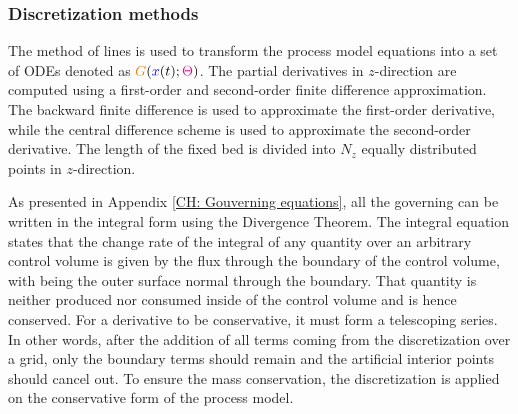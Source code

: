 \documentclass[../Article_Model_Parameters.tex]{subfiles}
\begin{document}
			\subsubsection{Discretization methods}
			
			The method of lines is used to transform the process model equations into a set of ODEs denoted as ${\color{orange}G}({\color{blue}x}(t);{\color{magenta}\Theta})$. The partial derivatives in $z$-direction are computed using a first-order and second-order finite difference approximation. The backward finite difference is used to approximate the first-order derivative, while the central difference scheme is used to approximate the second-order derivative. The length of the fixed bed is divided into $N_z$ equally distributed points in $z$-direction. 
			
			As presented in Appendix \ref{CH: Gouverning equations}, all the governing can be written in the integral form using the Divergence Theorem. The integral equation states that the change rate of the integral of any quantity over an arbitrary control volume is given by the flux through the boundary of the control volume, with being the outer surface normal through the boundary. That quantity is neither produced nor consumed inside of the control volume and is hence conserved. For a derivative to be conservative, it must form a telescoping series. In other words, after the addition of all terms coming from the discretization over a grid, only the boundary terms should remain and the artificial interior points should cancel out. To ensure the mass conservation, the discretization is applied on the conservative form of the process model.
			
%			
%			
			
\end{document}
